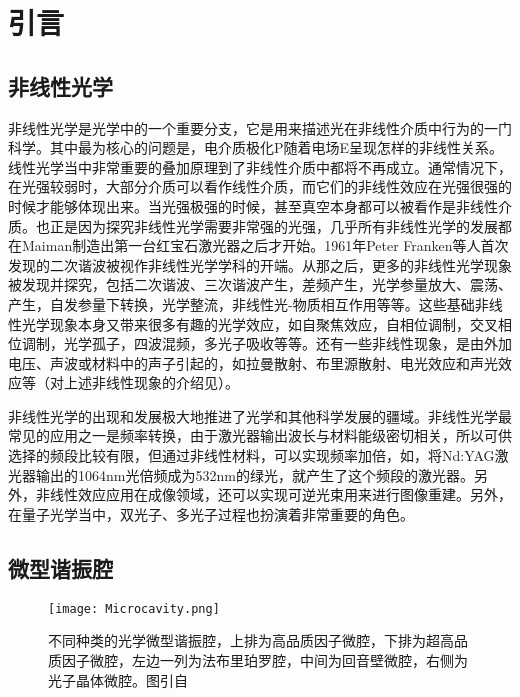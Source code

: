 \chapter{引言}
\label{cha:intro}

\section{非线性光学}

非线性光学是光学中的一个重要分支，它是用来描述光在非线性介质中行为的一门科学。其中最为核心的问题是，电介质极化P随着电场E呈现怎样的非线性关系。线性光学当中非常重要的叠加原理到了非线性介质中都将不再成立。通常情况下，在光强较弱时，大部分介质可以看作线性介质，而它们的非线性效应在光强很强的时候才能够体现出来。当光强极强的时候，甚至真空本身都可以被看作是非线性介质。也正是因为探究非线性光学需要非常强的光强，几乎所有非线性光学的发展都在Maiman制造出第一台红宝石激光器之后才开始\cite{maiman1960stimulated}。1961年Peter Franken等人首次发现的二次谐波被视作非线性光学学科的开端\cite{franken1961generation}。从那之后，更多的非线性光学现象被发现并探究，包括二次谐波、三次谐波产生，差频产生，光学参量放大、震荡、产生，自发参量下转换，光学整流，非线性光-物质相互作用等等。这些基础非线性光学现象本身又带来很多有趣的光学效应，如自聚焦效应，自相位调制，交叉相位调制，光学孤子，四波混频，多光子吸收等等。还有一些非线性现象，是由外加电压、声波或材料中的声子引起的，如拉曼散射、布里源散射、电光效应和声光效应等（对上述非线性现象的介绍见\cite{boyd2003nonlinear}）。

非线性光学的出现和发展极大地推进了光学和其他科学发展的疆域。非线性光学最常见的应用之一是频率转换，由于激光器输出波长与材料能级密切相关，所以可供选择的频段比较有限，但通过非线性材料，可以实现频率加倍，如，将Nd:YAG激光器输出的1064nm光倍频成为532nm的绿光，就产生了这个频段的激光器。另外，非线性效应应用在成像领域，还可以实现可逆光束用来进行图像重建。另外，在量子光学当中，双光子、多光子过程也扮演着非常重要的角色\cite{scully1999quantum}。

\section{微型谐振腔}

\begin{figure}
\centering
\texttt{[image: Microcavity.png]}
\caption{不同种类的光学微型谐振腔，上排为高品质因子微腔，下排为超高品质因子微腔，左边一列为法布里珀罗腔，中间为回音壁微腔，右侧为光子晶体微腔。图引自\cite{vahala2003optical}}
\label{pic:Microcavity}
\end{figure}

